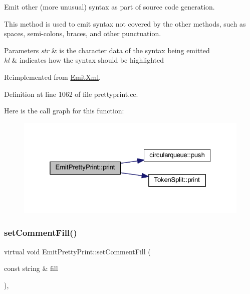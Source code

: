 Emit other (more unusual) syntax as part of source code generation. 

This method is used to emit syntax not covered by the other methods, such as spaces, semi-\/colons, braces, and other punctuation. 
\begin{DoxyParams}{Parameters}
{\em str} & is the character data of the syntax being emitted \\
\hline
{\em hl} & indicates how the syntax should be highlighted \\
\hline
\end{DoxyParams}


Reimplemented from \mbox{\hyperlink{class_emit_xml_a287234536199377d46179762127875ac}{Emit\+Xml}}.



Definition at line 1062 of file prettyprint.\+cc.

Here is the call graph for this function\+:
\nopagebreak
\begin{figure}[H]
\begin{center}
\leavevmode
\includegraphics[width=325pt]{class_emit_pretty_print_ac0134af230be5c379fd8173a7e99fac7_cgraph}
\end{center}
\end{figure}
\mbox{\label{class_emit_pretty_print_a6e429a78f31bc1e30f902dbd4de21006}} 
\subsubsection{\texorpdfstring{setCommentFill()}{setCommentFill()}}
{\footnotesize\ttfamily virtual void Emit\+Pretty\+Print\+::set\+Comment\+Fill (\begin{DoxyParamCaption}\item[{const string \&}]{fill }\end{DoxyParamCaption})\hspace{0.3cm}{\ttfamily [inline]}, {\ttfamily [virtual]}}



